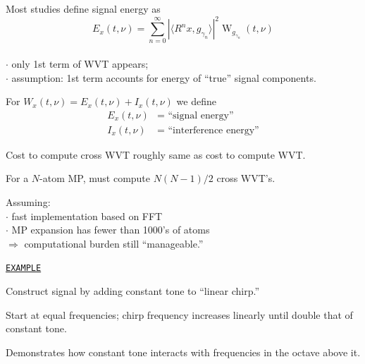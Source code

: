 \documentclass{slides}
\def\W{\operatorname{W}}
\begin{document}
\begin{slide}
Most studies define signal energy as
\[
E_x(t,\nu) = \sum_{n=0}^\infty 
    \left|\langle R^nx,g_{\gamma_n}\rangle\right|^2 \W_{g_{\gamma_n}}(t,\nu) 
\]
\\
$\cdot$ only 1st term of WVT appears; \\
$\cdot$ assumption: 1st term accounts for energy of ``true'' signal components.

For $W_x(t,\nu)=E_x(t,\nu) +I_x(t,\nu)$ we define 
\begin{align*}
E_x(t,\nu) &= \text{ ``signal energy''} \\
I_x(t,\nu) &= \text{ ``interference energy''}
\end{align*}
\end{slide}
\begin{slide}%
Cost to compute cross WVT %
roughly same as cost to compute WVT.

For a $N$-atom MP, must compute $N(N-1)/2$ cross WVT's.

Assuming:\\
$\cdot$ fast implementation based on FFT \\
$\cdot$ MP expansion has fewer than 1000's of atoms\\
$\Rightarrow$ computational burden still ``manageable.''
\end{slide}
\begin{slide}%
\begin{center}{\tt \underline{EXAMPLE}}\end{center}
Construct signal by adding constant tone to ``linear chirp.''

Start at equal frequencies; chirp frequency increases linearly until double
that of constant tone. 

Demonstrates how constant tone interacts with frequencies 
in the octave above it.
\end{slide}
\end{document}
